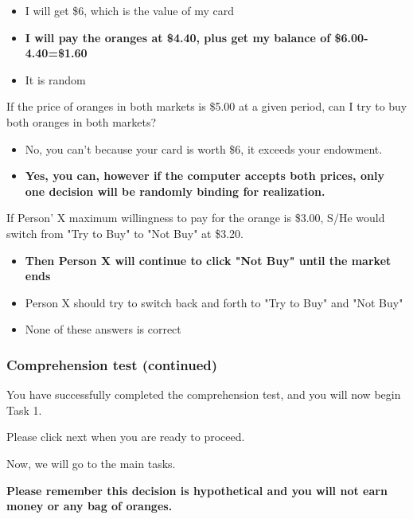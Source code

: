 \documentclass[12pt]{article}
\begin{document}
\begin{itemize}
    \item I will get \$6, which is the value of my card
    \item \textbf{I will pay the oranges at \$4.40, plus get my balance of \$6.00-4.40=\$1.60}
    \item It is random
\end{itemize}

\vspace{0.5cm}


If the price of oranges in both markets is \$5.00 at a given period, can I try to buy both oranges in both markets?

\begin{itemize}
    \item No, you can’t because your card is worth \$6, it exceeds your endowment.
    \item \textbf{Yes, you can, however if the computer accepts both prices, only one decision will be randomly binding for realization.}
\end{itemize}

\vspace{0.5cm}

If Person' X maximum willingness to pay for the orange is \$3.00, S/He would switch from "Try to Buy" to "Not Buy" at \$3.20.

\begin{itemize}
    \item \textbf{Then Person X will continue to click "Not Buy" until the market ends}
    
    \item Person X should try to switch back and forth to "Try to Buy" and "Not Buy"
    \item None of these answers is correct
\end{itemize}

\clearpage



\subsubsection*{Comprehension test (continued)}

You have successfully completed the comprehension test, and you will now begin Task 1.

 Please click next when you are ready to proceed.

 Now, we will go to the main tasks. 
 
 \textbf{Please remember this decision is hypothetical and you will not earn money or any bag of oranges.}
\end{document}
